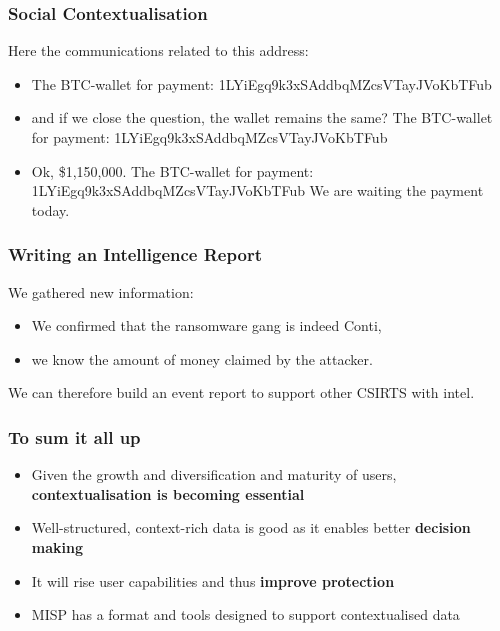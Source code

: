 \begin{frame}[fragile]
    \frametitle{Social Contextualisation}
    Here the communications related to this address:

    \begin{itemize}
        \item The BTC-wallet for payment: 1LYiEgq9k3xSAddbqMZcsVTayJVoKbTFub
        \item and if we close the question, the wallet remains the same? The BTC-wallet for payment: 1LYiEgq9k3xSAddbqMZcsVTayJVoKbTFub
        \item Ok, \$1,150,000. The BTC-wallet for payment: 1LYiEgq9k3xSAddbqMZcsVTayJVoKbTFub We are waiting the payment today.
    \end{itemize}

\end{frame}

\begin{frame}[fragile]
    \frametitle{Writing an Intelligence Report}
    We gathered new information:
    \begin{itemize}
        \item We confirmed that the ransomware gang is indeed Conti,
        \item we know the amount of money claimed by the attacker.
    \end{itemize}

    We can therefore build an event report to support other CSIRTS with intel.
\end{frame}

\begin{frame}
    \frametitle{To sum it all up}
    \begin{itemize}
        \item Given the growth and diversification and maturity of users, \textbf{contextualisation is becoming essential}
        \item Well-structured, context-rich data is good as it enables better \textbf{decision making}
        \item It will rise user capabilities and thus \textbf{improve protection}
        \item MISP has a format and tools designed to support contextualised data
    \end{itemize}

\end{frame}

